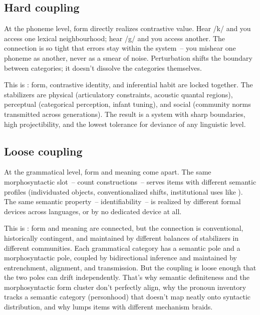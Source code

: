 \subsection{Hard coupling}
\label{sec:8:hard-coupling}

At the phoneme level, form directly realizes contrastive value. Hear /k/ and you access one lexical neighbourhood; hear /g/ and you access another. The connection is so tight that errors stay within the system~-- you mishear one phoneme as another, never as a smear of noise. Perturbation shifts the boundary between categories; it doesn't dissolve the categories themselves.

This is : form, contrastive identity, and inferential habit are locked together. The stabilizers are physical (articulatory constraints, acoustic quantal regions), perceptual (categorical perception, infant tuning), and social (community norms transmitted across generations). The result is a system with sharp boundaries, high projectibility, and the lowest tolerance for deviance of any linguistic level.

\subsection{Loose coupling}
\label{sec:8:loose-coupling}

At the grammatical level, form and meaning come apart. The same morphosyntactic slot~-- count constructions~-- serves items with different semantic profiles (individuated objects, conventionalized shifts, institutional uses like ). The same semantic property~-- identifiability~-- is realized by different formal devices across languages, or by no dedicated device at all.

This is : form and meaning are connected, but the connection is conventional, historically contingent, and maintained by different balances of stabilizers in different communities. Each grammatical category has a semantic pole and a morphosyntactic pole, coupled by bidirectional inference and maintained by entrenchment, alignment, and transmission. But the coupling is loose enough that the two poles can drift independently. That's why semantic definiteness and the morphosyntactic form cluster don't perfectly align, why the pronoun inventory tracks a semantic category (personhood) that doesn't map neatly onto syntactic distribution, and why  lumps items with different mechanism braids.

